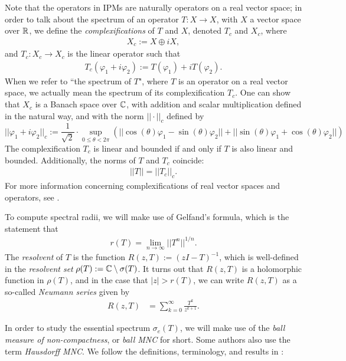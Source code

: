 Note that the operators in IPMs are naturally operators on a real vector space; in order to talk about the spectrum of an operator $T:X \to X$, with $X$ a vector space over $\mathbb{R}$, we define the \emph{complexifications} of $T$ and $X$, denoted $T_c$ and $X_c$, where
\begin{align}
	X_c := X \oplus i X \label{eqn:complexifyxpace},
\end{align}
and $T_c: X_c \to X_c$ is the linear operator such that
\begin{align}
	T_c(\varphi_1 + i \varphi_2) := T(\varphi_1) + i T(\varphi_2). \label{eqn:complexifyT}
\end{align}
When we refer to ``the spectrum of $T$", where $T$ is an operator on a real vector space, we actually mean the spectrum of its complexification $T_c$. One can show that $X_c$ is a Banach space over $\mathbb{C}$, with addition and scalar multiplication defined in the natural way, and with the norm $|| \cdot ||_c$ defined by
\[||\varphi_1 + i \varphi_2||_c := \frac{1}{\sqrt 2} \cdot \sup_{0 \leq \theta < 2\pi} (||\cos( \theta ) \varphi_1 - \sin( \theta ) \varphi_2|| + ||\sin( \theta ) \varphi_1 + \cos( \theta ) \varphi_2 ||)\]
The complexification $T_c$ is linear and bounded if and only if $T$ is also linear and bounded. Additionally, the norms of $T$ and $T_c$ coincide:
\begin{align}
	||T|| = ||T_c||_c. \label{eqn:equalnorms}
\end{align}
For more information concerning complexifications of real vector spaces and operators, see \cite{Edmunds1972}. 

To compute spectral radii, we will make use of Gelfand's formula, which is the statement that
\begin{align}
	r(T) = \lim_{n \to \infty} ||T^n||^{1/n}. \label{eqn:gelfand}
\end{align}
The \emph{resolvent} of $T$ is the function $R(z, T):= (zI - T)^{-1}$, which is well-defined in the \emph{resolvent set} $\rho(T):= \mathbb{C} \setminus \sigma(T)$. It turns out that $R(z, T)$ is a holomorphic function in $\rho(T)$, and in the case that $|z| > r(T)$, we can write $R(z, T)$ as a so-called \emph{Neumann series} given by
\begin{align}
	R(z, T) &= \sum_{k = 0}^\infty \frac{T^k}{z^{k+1}}. \label{eqn:neumannseries}
\end{align}	

In order to study the essential spectrum $\sigma_e(T)$, we will make use of the \emph{ball measure of non-compactness}, or \emph{ball MNC} for short. Some authors also use the term \emph{Hausdorff MNC}. We follow the definitions, terminology, and results in \cite{Akhmerov1992}:

